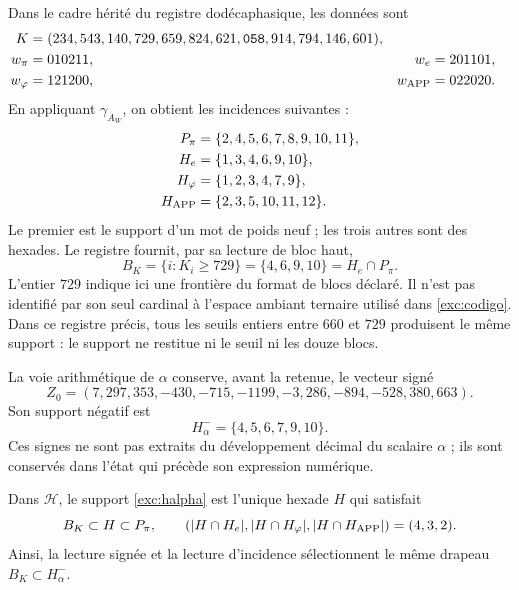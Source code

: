 Dans le cadre hérité du registre dodécaphasique, les données sont
\begin{align}
 K={}&(234,543,140,729,659,824,621,\mathtt{058},914,794,146,601),
 \label{exc:k}\\
 w_\pi={}&010211, &w_e={}&201101,\nonumber\\
 w_\varphi={}&121200, &w_{\rm APP}={}&022020.\nonumber
\end{align}
En appliquant $\gamma_{A_W}$, on obtient les incidences suivantes :
\begin{align*}
 P_\pi&=\{2,4,5,6,7,8,9,10,11\},\\
 H_e&=\{1,3,4,6,9,10\},\\
 H_\varphi&=\{1,2,3,4,7,9\},\\
 H_{\rm APP}&=\{2,3,5,10,11,12\}.
\end{align*}
Le premier est le support d'un mot de poids neuf ; les trois autres
sont des hexades. Le registre fournit, par sa lecture de bloc haut,
\begin{equation}
 B_K=\{i:K_i\geq729\}=\{4,6,9,10\}=H_e\cap P_\pi.
 \label{exc:bk}
\end{equation}
L'entier $729$ indique ici une frontière du format de blocs
déclaré. Il n'est pas identifié par son seul cardinal à l'espace ambiant
ternaire utilisé dans \eqref{exc:codigo}. Dans ce registre précis, tous
les seuils entiers entre $660$ et $729$ produisent le même support :
le support ne restitue ni le seuil ni les douze blocs.

La voie arithmétique de $\alpha$ conserve, avant la retenue, le vecteur
signé
\begin{equation}
 Z_0=(7,297,353,-430,-715,-1199,-3,286,-894,-528,380,663).
 \label{exc:precarry}
\end{equation}
Son support négatif est
\begin{equation}
 H^-_\alpha=\{4,5,6,7,9,10\}.
 \label{exc:halpha}
\end{equation}
Ces signes ne sont pas extraits du développement décimal du scalaire
$\alpha$ ; ils sont conservés dans l'état qui précède son expression numérique.



\begin{proposition}
\label{exc:selector-bandera}
Dans $\mathcal H$, le support \eqref{exc:halpha} est l'unique hexade $H$ qui satisfait
\[
 B_K\subset H\subset P_\pi,
 \qquad
 (|H\cap H_e|,|H\cap H_\varphi|,|H\cap H_{\rm APP}|)=(4,3,2).
\]
Ainsi, la lecture signée et la lecture d'incidence sélectionnent le même
drapeau $B_K\subset H^-_\alpha$.
\end{proposition}

